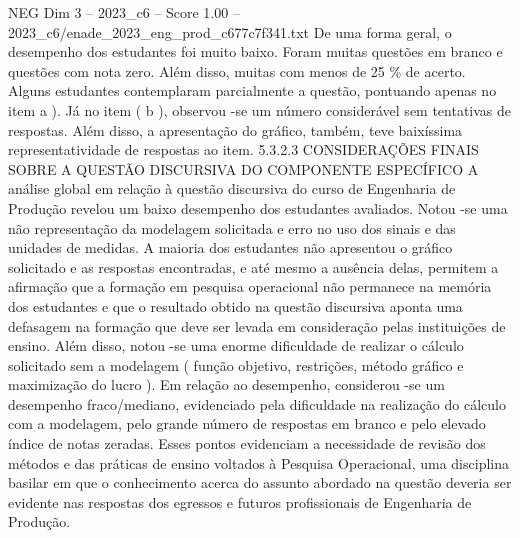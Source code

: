 \begin{textsample}{NEG Dim 3 – 2023\_c6 – Score 1.00 – 2023\_c6/enade\_2023\_eng\_prod\_c677c7f341.txt}
De uma forma geral, o desempenho dos estudantes foi muito baixo.
Foram muitas questões em branco e questões com nota zero.
Além disso, muitas com menos de 25 \% de acerto.
Alguns estudantes contemplaram parcialmente a questão, pontuando apenas no item a ).
Já no item ( b ), observou -se um número considerável sem tentativas de respostas.
Além disso, a apresentação do gráfico, também, teve baixíssima representatividade de respostas ao item. 5.3.2.3 CONSIDERAÇÕES FINAIS SOBRE A QUESTÃO DISCURSIVA DO COMPONENTE ESPECÍFICO A análise global em relação à questão discursiva do curso de Engenharia de Produção revelou um baixo desempenho dos estudantes avaliados.
Notou -se uma não representação da modelagem solicitada e erro no uso dos sinais e das unidades de medidas.
A maioria dos estudantes não apresentou o gráfico solicitado e as respostas encontradas, e até mesmo a ausência delas, permitem a afirmação que a formação em pesquisa operacional não permanece na memória dos estudantes e que o resultado obtido na questão discursiva aponta uma defasagem na formação que deve ser levada em consideração pelas instituições de ensino.
Além disso, notou -se uma enorme dificuldade de realizar o cálculo solicitado sem a modelagem ( função objetivo, restrições, método gráfico e maximização do lucro ).
Em relação ao desempenho, considerou -se um desempenho fraco/mediano, evidenciado pela dificuldade na realização do cálculo com a modelagem, pelo grande número de respostas em branco e pelo elevado índice de notas zeradas.
Esses pontos evidenciam a necessidade de revisão dos métodos e das práticas de ensino voltados à Pesquisa Operacional, uma disciplina basilar em que o conhecimento acerca do assunto abordado na questão deveria ser evidente nas respostas dos egressos e futuros profissionais de Engenharia de Produção.

\end{textsample}
